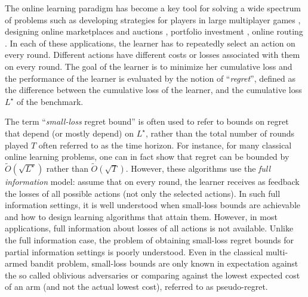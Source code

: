 
The online learning paradigm \citep{Littlestone1994,prediction_book}
has become a key tool for solving a wide spectrum of problems such as  developing strategies for players in large multiplayer games \citep{Blum2006,Blum2008,Roughgarden15,LykourisST16,FosterLLST16},  designing online marketplaces and auctions \citep{BlumHartline,Cesa-Bianchi2013,Roughgarden:2016MRM}, portfolio investment \citep{Cover91,Freund97,HazanKaleAurora07}, online routing
\citep{AwerbuchK04,KalaiVempala}. In each of these applications, the learner has to repeatedly select an action on every round. Different actions have different costs or losses associated with them on every round. The goal of the learner is to minimize her cumulative loss and the performance of the learner is evaluated by the notion of  ``\emph{regret}'', 
defined as the difference between the cumulative loss of the learner, and the cumulative loss $L^\star$ of the benchmark. 

The term ``\emph{small-loss} regret bound'' is often used to refer to bounds on regret that depend (or mostly depend) on $L^\star$, rather than the total number of rounds played $T$ often referred to as the time horizon. For instance, for many classical online learning problems, one can in fact show that regret can be bounded by $\widetilde O(\sqrt{L^\star})$ rather than $\widetilde O(\sqrt{T})$. However, these algorithms use the \emph{full information} model:  assume that
on every round, the learner receives as feedback the losses of all possible actions (not only the selected actions). In such full information settings, it is well understood when small-loss bounds are achievable and how to design learning algorithms that attain them. However, in most applications, full information about losses of all actions is not available. 
Unlike the full information case, the problem of obtaining small-loss regret bounds for partial information settings is poorly understood. Even
in the classical multi-armed bandit problem,
small-loss bounds are only known in expectation against the so called oblivious adversaries or comparing against the lowest expected cost of an arm (and not the actual lowest cost), referred to as pseudo-regret.

